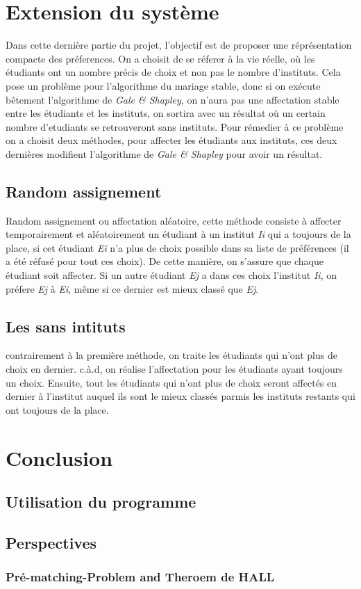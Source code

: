 \documentclass[12pt,titlepage]{article}
\begin{document}
\section{Extension du système}
Dans cette dernière partie du projet, l'objectif est de proposer une réprésentation compacte des préferences. On a choisit de se réferer à la vie réelle, où les étudiants ont un nombre précis de choix et non pas le nombre d'instituts. Cela pose un problème pour l'algorithme du mariage stable, donc si on exécute bêtement l'algorithme de \textit{Gale \& Shapley}, on n'aura pas une affectation stable entre les étudiants et les instituts, on sortira avec un résultat où un certain nombre d'etudiants se retrouveront sans instituts. Pour rémedier à ce problème on a choisit deux méthodes, pour affecter les étudiants aux instituts, ces deux dernières modifient l'algorithme de \textit{Gale \& Shapley} pour avoir un résultat.

\subsection{Random assignement}
Random assignement ou affectation aléatoire, cette méthode consiste à affecter temporairement et aléatoirement un étudiant à un institut \textit{Ii} qui a toujours de la place, si cet étudiant \textit{Ei} n'a plus de choix possible dans sa liste de préférences (il a été réfusé pour tout ces choix). De cette manière, on s'assure que chaque étudiant soit affecter. Si un autre étudiant \textit{Ej} a dans ces choix l'institut \textit{Ii}, on préfere \textit{Ej} à \textit{Ei}, même si ce dernier est mieux classé que \textit{Ej}.
\subsection{Les sans intituts}
contrairement à la première méthode, on traite les étudiants qui n'ont plus de choix en dernier. c.à.d, on réalise l'affectation pour les étudiants ayant toujours un choix. Ensuite, tout les étudiants qui n'ont plus de choix seront affectés en dernier à l'institut auquel ils sont le mieux classés parmis les instituts restants qui ont toujours de la place.

\section{Conclusion}

\subsection{Utilisation du programme}


\subsection{Perspectives}

\subsubsection{Pré-matching-Problem and Theroem de HALL}
\end{document}
